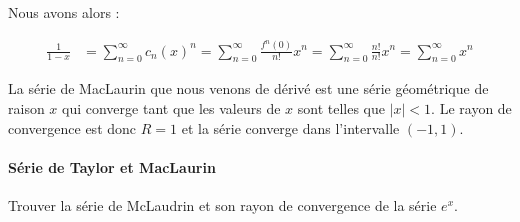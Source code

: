 \documentclass{report}
\begin{document}
\begin{multicols*}{2}
      Nous avons alors :

      \begin{align*}
        \frac{1}{1 - x} &= \sum_{n=0}^{\infty }c_n(x)^n 
                         = \sum_{n=0}^{\infty }\frac{f^{n}(0)}{n!}x^n 
                         = \sum_{n=0}^{\infty }\frac{n!}{n!}x^n 
                         = \sum_{n=0}^{\infty }x^n 
      \end{align*}  

      La série de MacLaurin que nous venons de dérivé est une 
      série géométrique de raison $x$ qui converge 
      tant que les valeurs de $x$ sont telles que 
      $|x| < 1$. Le rayon de convergence est donc $R = 1$ et 
      la série converge dans l'intervalle $(-1, 1)$.

      \paragraph{Série de Taylor et MacLaurin}
      Trouver la série de McLaudrin et son rayon de convergence 
      de la série $e^x$. 









  








 









\end{multicols*}
\end{document}
